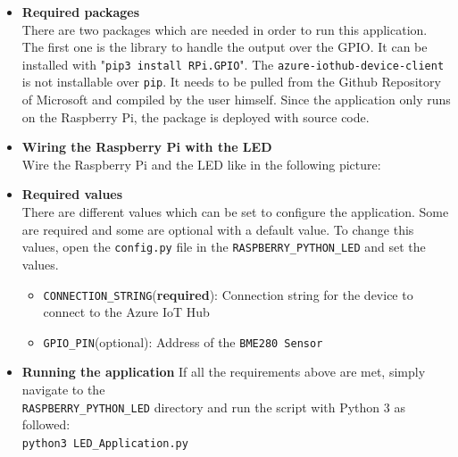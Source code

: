 \documentclass[a4paper]{article}
\begin{document}
				\begin{itemize}
				\item \textbf{Required packages}\\
				There are two packages which are needed in order to run this application. 
				The first one is the library to handle the output over the GPIO.
				It can be installed with "\texttt{pip3 install RPi.GPIO}".
				The \texttt{azure-iothub-device-client} is not installable over \texttt{pip}.
				It needs to be pulled from the Github Repository of Microsoft and compiled by the user himself.
				Since the application only runs on the Raspberry Pi, the package is deployed with source code.
				\\
				\item \textbf{Wiring the Raspberry Pi with the LED}
				\\
				Wire the Raspberry Pi and the LED like in the following picture:
				\\
				\item \textbf{Required values}\\
				There are different values which can be set to configure the application.
				Some are required and some are optional with a default value.
				To change this values, open the \texttt{config.py} file in the \texttt{RASPBERRY\_PYTHON\_LED} and set the values.
				\begin{itemize}
					\item \texttt{CONNECTION\_STRING}(\textbf{required}): Connection string for the device to connect to the Azure IoT Hub
					\item \texttt{GPIO\_PIN}(optional): Address of the \texttt{BME280 Sensor}
					\\
				\end{itemize}
				
				
				\item \textbf{Running the application}
				If all the requirements above are met, simply navigate to the \\ \texttt{RASPBERRY\_PYTHON\_LED} directory and run the script with Python 3 as followed:
				\\
				\texttt{python3 LED\_Application.py}
				
			\end{itemize}
			
\end{document}
